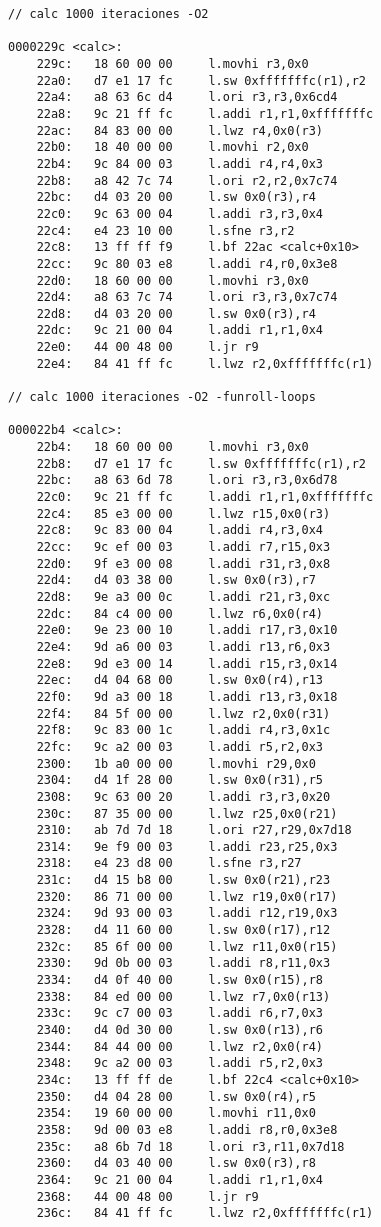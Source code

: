 	\begin{lstlisting}[frame=single]
// calc 1000 iteraciones -O2

0000229c <calc>:
    229c:	18 60 00 00 	l.movhi r3,0x0
    22a0:	d7 e1 17 fc 	l.sw 0xfffffffc(r1),r2
    22a4:	a8 63 6c d4 	l.ori r3,r3,0x6cd4
    22a8:	9c 21 ff fc 	l.addi r1,r1,0xfffffffc
    22ac:	84 83 00 00 	l.lwz r4,0x0(r3)
    22b0:	18 40 00 00 	l.movhi r2,0x0
    22b4:	9c 84 00 03 	l.addi r4,r4,0x3
    22b8:	a8 42 7c 74 	l.ori r2,r2,0x7c74
    22bc:	d4 03 20 00 	l.sw 0x0(r3),r4
    22c0:	9c 63 00 04 	l.addi r3,r3,0x4
    22c4:	e4 23 10 00 	l.sfne r3,r2
    22c8:	13 ff ff f9 	l.bf 22ac <calc+0x10>
    22cc:	9c 80 03 e8 	l.addi r4,r0,0x3e8
    22d0:	18 60 00 00 	l.movhi r3,0x0
    22d4:	a8 63 7c 74 	l.ori r3,r3,0x7c74
    22d8:	d4 03 20 00 	l.sw 0x0(r3),r4
    22dc:	9c 21 00 04 	l.addi r1,r1,0x4
    22e0:	44 00 48 00 	l.jr r9
    22e4:	84 41 ff fc 	l.lwz r2,0xfffffffc(r1)

// calc 1000 iteraciones -O2 -funroll-loops

000022b4 <calc>:
    22b4:	18 60 00 00 	l.movhi r3,0x0
    22b8:	d7 e1 17 fc 	l.sw 0xfffffffc(r1),r2
    22bc:	a8 63 6d 78 	l.ori r3,r3,0x6d78
    22c0:	9c 21 ff fc 	l.addi r1,r1,0xfffffffc
    22c4:	85 e3 00 00 	l.lwz r15,0x0(r3)
    22c8:	9c 83 00 04 	l.addi r4,r3,0x4
    22cc:	9c ef 00 03 	l.addi r7,r15,0x3
    22d0:	9f e3 00 08 	l.addi r31,r3,0x8
    22d4:	d4 03 38 00 	l.sw 0x0(r3),r7
    22d8:	9e a3 00 0c 	l.addi r21,r3,0xc
    22dc:	84 c4 00 00 	l.lwz r6,0x0(r4)
    22e0:	9e 23 00 10 	l.addi r17,r3,0x10
    22e4:	9d a6 00 03 	l.addi r13,r6,0x3
    22e8:	9d e3 00 14 	l.addi r15,r3,0x14
    22ec:	d4 04 68 00 	l.sw 0x0(r4),r13
    22f0:	9d a3 00 18 	l.addi r13,r3,0x18
    22f4:	84 5f 00 00 	l.lwz r2,0x0(r31)
    22f8:	9c 83 00 1c 	l.addi r4,r3,0x1c
    22fc:	9c a2 00 03 	l.addi r5,r2,0x3
    2300:	1b a0 00 00 	l.movhi r29,0x0
    2304:	d4 1f 28 00 	l.sw 0x0(r31),r5
    2308:	9c 63 00 20 	l.addi r3,r3,0x20
    230c:	87 35 00 00 	l.lwz r25,0x0(r21)
    2310:	ab 7d 7d 18 	l.ori r27,r29,0x7d18
    2314:	9e f9 00 03 	l.addi r23,r25,0x3
    2318:	e4 23 d8 00 	l.sfne r3,r27
    231c:	d4 15 b8 00 	l.sw 0x0(r21),r23
    2320:	86 71 00 00 	l.lwz r19,0x0(r17)
    2324:	9d 93 00 03 	l.addi r12,r19,0x3
    2328:	d4 11 60 00 	l.sw 0x0(r17),r12
    232c:	85 6f 00 00 	l.lwz r11,0x0(r15)
    2330:	9d 0b 00 03 	l.addi r8,r11,0x3
    2334:	d4 0f 40 00 	l.sw 0x0(r15),r8
    2338:	84 ed 00 00 	l.lwz r7,0x0(r13)
    233c:	9c c7 00 03 	l.addi r6,r7,0x3
    2340:	d4 0d 30 00 	l.sw 0x0(r13),r6
    2344:	84 44 00 00 	l.lwz r2,0x0(r4)
    2348:	9c a2 00 03 	l.addi r5,r2,0x3
    234c:	13 ff ff de 	l.bf 22c4 <calc+0x10>
    2350:	d4 04 28 00 	l.sw 0x0(r4),r5
    2354:	19 60 00 00 	l.movhi r11,0x0
    2358:	9d 00 03 e8 	l.addi r8,r0,0x3e8
    235c:	a8 6b 7d 18 	l.ori r3,r11,0x7d18
    2360:	d4 03 40 00 	l.sw 0x0(r3),r8
    2364:	9c 21 00 04 	l.addi r1,r1,0x4
    2368:	44 00 48 00 	l.jr r9
    236c:	84 41 ff fc 	l.lwz r2,0xfffffffc(r1)


\end{lstlisting}
